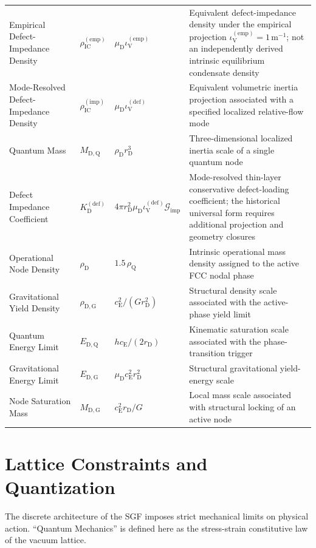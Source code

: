 \begin{longtable}[l]{@{} >{\raggedright\arraybackslash}p{4.2cm} l l >{\raggedright\arraybackslash}p{6.5cm} @{}}
Empirical Defect-Impedance Density & $\rho_{\mathrm{IC}}^{(\mathrm{emp})}$ & $\mu_{\mathrm{D}}\iota_{\mathrm{V}}^{(\mathrm{emp})}$ & Equivalent defect-impedance density under the empirical projection $\iota_{\mathrm{V}}^{(\mathrm{emp})}=1\,\mathrm{m}^{-1}$; not an independently derived intrinsic equilibrium condensate density \\
Mode-Resolved Defect-Impedance Density & $\rho_{\mathrm{IC}}^{(\mathrm{imp})}$ & $\mu_{\mathrm{D}}\iota_{\mathrm{V}}^{(\mathrm{def})}$ & Equivalent volumetric inertia projection associated with a specified localized relative-flow mode \\
Quantum Mass & $M_{\mathrm{D,Q}}$ & $\rho_{\mathrm{D}}r_{\mathrm{D}}^{3}$ & Three-dimensional localized inertia scale of a single quantum node \\
Defect Impedance Coefficient & $K_{\mathrm{D}}^{(\mathrm{def})}$ & $4\pi r_{\mathrm{D}}^{2}\mu_{\mathrm{D}}\iota_{\mathrm{V}}^{(\mathrm{def})}\mathcal{G}_{\mathrm{imp}}$ & Mode-resolved thin-layer conservative defect-loading coefficient; the historical universal form requires additional projection and geometry closures \\
Operational Node Density & $\rho_{\mathrm{D}}$ & $1.5\,\rho_{\mathrm{Q}}$ & Intrinsic operational mass density assigned to the active FCC nodal phase \\
Gravitational Yield Density & $\rho_{\mathrm{D,G}}$ & $c_{\mathrm{E}}^{2}/(G r_{\mathrm{D}}^{2})$ & Structural density scale associated with the active-phase yield limit \\
Quantum Energy Limit & $E_{\mathrm{D,Q}}$ & $h c_{\mathrm{E}}/(2r_{\mathrm{D}})$ & Kinematic saturation scale associated with the phase-transition trigger \\
Gravitational Energy Limit & $E_{\mathrm{D,G}}$ & $\mu_{\mathrm{D}}c_{\mathrm{E}}^{2}r_{\mathrm{D}}^{2}$ & Structural gravitational yield-energy scale \\
Node Saturation Mass & $M_{\mathrm{D,G}}$ & $c_{\mathrm{E}}^{2}r_{\mathrm{D}}/G$ & Local mass scale associated with structural locking of an active node \\

\end{longtable}
\vspace{0.3em}

\chapter{Lattice Constraints and Quantization}
The discrete architecture of the SGF imposes strict mechanical limits on physical action. ``Quantum Mechanics'' is defined here as the stress-strain constitutive law of the vacuum lattice.

